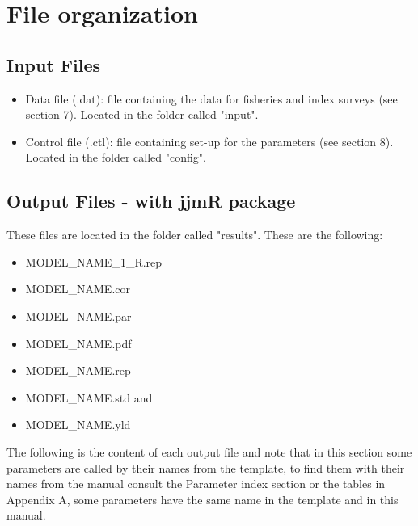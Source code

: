 \documentclass{article}
\begin{document}
\section{File organization}

\subsection{Input Files}
\begin{itemize}
\item Data file (.dat):  file containing the data for fisheries and index surveys (see section 7). Located in the folder called "input".
\item Control file (.ctl): file containing set-up for the parameters (see section 8). Located in the folder called "config".    
    
\end{itemize}

\subsection{Output Files - with jjmR package}

These files are located in the folder called "results". These are the following: 
\begin{itemize} 
\item MODEL\_NAME\_1\_R.rep 
\item MODEL\_NAME.cor 
\item MODEL\_NAME.par 
\item MODEL\_NAME.pdf 
\item MODEL\_NAME.rep 
\item MODEL\_NAME.std and 
\item MODEL\_NAME.yld  
\end{itemize}

The following is the content of each output file and note that in this section some parameters are called by their names from the template, to find them with their names from the manual consult the Parameter index section or the tables in Appendix A, some parameters have the same name in the template and in this manual.
    
\end{document}
